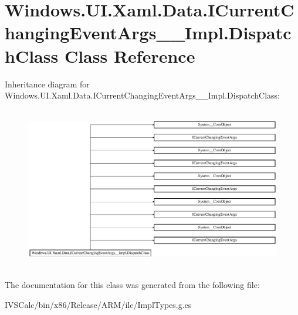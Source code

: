 \hypertarget{class_windows_1_1_u_i_1_1_xaml_1_1_data_1_1_i_current_changing_event_args_____impl_1_1_dispatch_class}{}\section{Windows.\+U\+I.\+Xaml.\+Data.\+I\+Current\+Changing\+Event\+Args\+\_\+\+\_\+\+Impl.\+Dispatch\+Class Class Reference}
\label{class_windows_1_1_u_i_1_1_xaml_1_1_data_1_1_i_current_changing_event_args_____impl_1_1_dispatch_class}
Inheritance diagram for Windows.\+U\+I.\+Xaml.\+Data.\+I\+Current\+Changing\+Event\+Args\+\_\+\+\_\+\+Impl.\+Dispatch\+Class\+:\begin{figure}[H]
\begin{center}
\leavevmode
\includegraphics[height=7.162791cm]{class_windows_1_1_u_i_1_1_xaml_1_1_data_1_1_i_current_changing_event_args_____impl_1_1_dispatch_class}
\end{center}
\end{figure}


The documentation for this class was generated from the following file\+:\begin{DoxyCompactItemize}
\item 
I\+V\+S\+Calc/bin/x86/\+Release/\+A\+R\+M/ilc/Impl\+Types.\+g.\+cs\end{DoxyCompactItemize}
